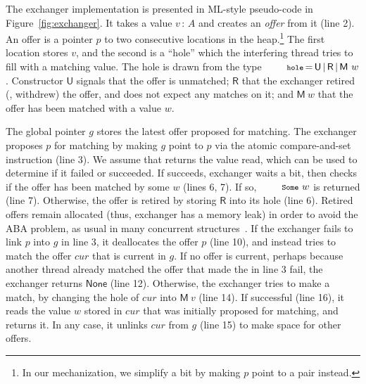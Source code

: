 \newcommand{\Unmatched}{{\mathsf{U}}}
\newcommand{\Matched}[1]{{\mathsf{M}\ #1}}
\newcommand{\Retired}{{\mathsf{R}}}


The exchanger implementation is presented in ML-style pseudo-code in
Figure~\ref{fig:exchanger}. It takes a value $v\,{:}\,A$ and creates
an \emph{offer} from it (line 2). An offer is a pointer $p$ to two
consecutive locations in the heap.\footnote{In our mechanization, we
  simplify a bit by making $p$ point to a pair instead.}
%
The first location stores $v$, and the second is a ``hole'' which the
interfering thread tries to fill with a matching value. The hole is
drawn from the type
$\esc{hole}\,{=}\,\Unmatched\,{\mid}\,\Retired\,{\mid}\,\Matched
w$. Constructor $\Unmatched$ signals that the offer is unmatched;
$\Retired$ that the exchanger retired (\ie, withdrew) the offer, and
does not expect any matches on it; and $\Matched w$ that the offer has
been matched with a value $w$.

The global pointer $g$ stores the latest offer proposed for
matching. The exchanger proposes $p$ for matching by making $g$ point
to $p$ via the atomic compare-and-set instruction  (line
3). We assume that  returns the value read, which can be
used to determine if it failed or succeeded. If  succeeds,
exchanger waits a bit, then checks if the offer has been matched by
some $w$ (lines 6, 7). If so, $\esc{Some}\ w$ is returned (line
7). Otherwise, the offer is retired by storing $\Retired$ into its
hole (line 6). Retired offers remain allocated (thus, exchanger has a
memory leak) in order to avoid the ABA problem, as usual in many
concurrent structures~\cite{Herlihy-Shavit:08,Treiber:TR}.
%
If the exchanger fails to link $p$ into $g$ in line 3, it deallocates
the offer $p$ (line 10), and instead tries to match the offer $cur$
that is current in $g$. If no offer is current, perhaps because
another thread already matched the offer that made the  in
line 3 fail, the exchanger returns $\mathsf{None}$ (line
12). Otherwise, the exchanger tries to make a match, by changing the
hole of $cur$ into $\Matched v$ (line 14). If successful (line 16), it
reads the value $w$ stored in $cur$ that was initially proposed for
matching, and returns it. In any case, it unlinks $cur$ from $g$ (line
15) to make space for other offers.






